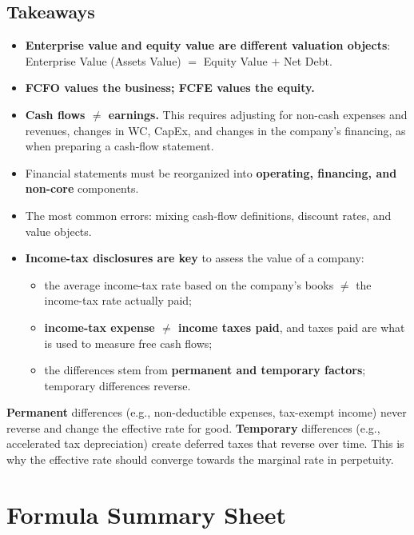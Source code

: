 \subsection{Takeaways}
\begin{itemize}
  \item \textbf{Enterprise value and equity value are different valuation objects}: Enterprise Value (Assets Value) $=$ Equity Value $+$ Net Debt.
  \item \textbf{FCFO values the business; FCFE values the equity.}
  \item \textbf{Cash flows $\neq$ earnings.} This requires adjusting for non-cash expenses and revenues, changes in WC, CapEx, and changes in the company's financing, as when preparing a cash-flow statement.
  \item Financial statements must be reorganized into \textbf{operating, financing, and non-core} components.
  \item The most common errors: mixing cash-flow definitions, discount rates, and value objects.
  \item \textbf{Income-tax disclosures are key} to assess the value of a company:
  \begin{itemize}
    \item the average income-tax rate based on the company's books $\neq$ the income-tax rate actually paid;
    \item \textbf{income-tax expense $\neq$ income taxes paid}, and taxes paid are what is used to measure free cash flows;
    \item the differences stem from \textbf{permanent and temporary factors}; temporary differences reverse.
  \end{itemize}
\end{itemize}

\begin{addbox}
\textbf{Permanent} differences (e.g., non-deductible expenses, tax-exempt income) never reverse and change the effective rate for good. \textbf{Temporary} differences (e.g., accelerated tax depreciation) create deferred taxes that reverse over time. This is why the effective rate should converge towards the marginal rate in perpetuity.
\end{addbox}

\section{Formula Summary Sheet}

